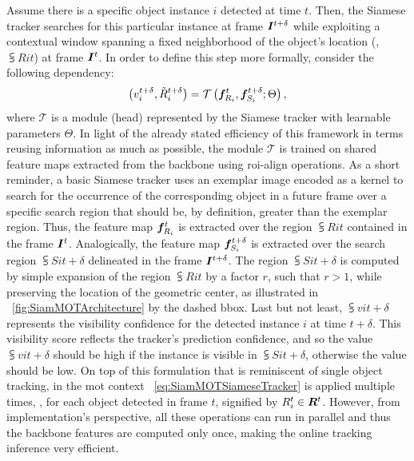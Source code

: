 Assume there is a specific object instance $i$ detected at time $t$. Then, the Siamese tracker searches for this particular instance at frame $\bm{I}^{t + \delta}$ while exploiting a contextual window spanning a fixed neighborhood of the object's location (\ietext{}, $\subsup{R}{i}{t}$) at frame $\bm{I}^{t}$. In order to define this step more formally, consider the following dependency:
\begin{equation}
    \label{eq:SiamMOTSiameseTracker}
    \left( {
        {v}_{i}^{t + \delta},
        {\tilde{R}}_{i}^{t + \delta}
    } \right) =
    {\mathcal{T}} \left( 
        \bm{f}_{R_i}^{t}, \bm{f}_{S_i}^{t + \delta}; \Theta
     \right),
\end{equation}
where $\mathcal{T}$ is a module (head) represented by the Siamese tracker with learnable parameters $\Theta$. In light of the already stated efficiency of this framework in terms reusing information as much as possible, the module $\mathcal{T}$ is trained on shared feature maps extracted from the backbone using \gls{roi}-align operations. As a short reminder, a basic Siamese tracker uses an exemplar image encoded as a kernel to search for the occurrence of the corresponding object in a future frame over a specific search region that should be, by definition, greater than the exemplar region. Thus, the feature map $\bm{f}_{R_i}^{t}$ is extracted over the region $\subsup{R}{i}{t}$ contained in the frame $\bm{I}^{t}$. Analogically, the feature map $\bm{f}_{S_i}^{t + \delta}$ is extracted over the search region $\subsup{S}{i}{t + \delta}$ delineated in the frame $\bm{I}^{t + \delta}$. The region $\subsup{S}{i}{t + \delta}$ is computed by simple expansion of the region $\subsup{R}{i}{t}$ by a factor $r$, such that $r > 1$, while preserving the location of the geometric center, as illustrated in \figtext{}~\ref{fig:SiamMOTArchitecture} by the dashed \gls{bbox}. Last but not least, $\subsup{v}{i}{t + \delta}$ represents the visibility confidence for the detected instance $i$ at time $t + \delta$. This visibility score reflects the tracker's prediction confidence, and so the value $\subsup{v}{i}{t + \delta}$ should be high if the instance is visible in $\subsup{S}{i}{t + \delta}$, otherwise the value should be low. On top of this formulation that is reminiscent of single object tracking, in the \gls{mot} context \eqtext{}~\ref{eq:SiamMOTSiameseTracker} is applied multiple times, \ietext{}, for each object detected in frame $t$, signified by ${R}_{i}^{t} \in \bm{R}^{t}$. However, from implementation's perspective, all these operations can run in parallel and thus the backbone features are computed only once, making the online tracking inference very efficient.

